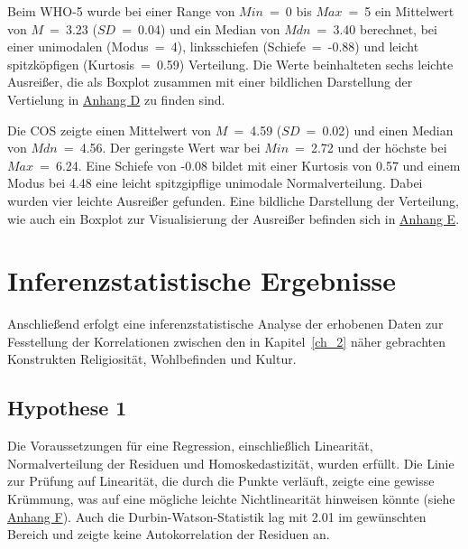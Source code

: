 Beim WHO-5 wurde bei einer Range von $Min$~=~0 bis $Max$~=~5 ein Mittelwert von $M$~=~3.23 ($SD$~=~0.04) und ein Median von $Mdn$~=~3.40 berechnet, bei einer unimodalen (Modus~=~4), linksschiefen (Schiefe~=~-0.88) und leicht spitzköpfigen (Kurtosis~=~0.59) Verteilung. Die Werte beinhalteten sechs leichte Ausreißer, die als Boxplot zusammen mit einer bildlichen Darstellung der Vertielung in \hyperref [Deskriptive_WHO]{Anhang D} zu finden sind.

Die COS zeigte einen Mittelwert von $M$~=~4.59 ($SD$~=~0.02) und einen Median von $Mdn$~=~4.56. Der geringste Wert war bei $Min$~=~2.72 und der höchste bei $Max$~=~6.24. Eine Schiefe von -0.08 bildet mit einer Kurtosis von 0.57 und einem Modus bei 4.48 eine leicht spitzgipflige unimodale Normalverteilung. Dabei wurden vier leichte Ausreißer gefunden.
Eine bildliche Darstellung der Verteilung, wie auch ein Boxplot zur Visualisierung der Ausreißer befinden sich in \hyperref [Verbreitung_COS]{Anhang E}.

%

%



\section{Inferenzstatistische Ergebnisse}    \label{sec_4.2}
Anschließend erfolgt eine inferenzstatistische Analyse der erhobenen Daten zur Fesstellung der Korrelationen zwischen den in Kapitel~\ref{ch_2} näher gebrachten Konstrukten Religiosität, Wohlbefinden und Kultur. 

\subsection{Hypothese 1}    \label{subsec_4.2.1}
Die Voraussetzungen für eine Regression, einschließlich Linearität, Normalverteilung der Residuen und Homoskedastizität, wurden erfüllt. Die Linie zur Prüfung auf Linearität, die durch die Punkte verläuft, zeigte eine gewisse Krümmung, was auf eine mögliche leichte Nichtlinearität hinweisen könnte (siehe \hyperref [H1_Voraussetzungen]{Anhang F}). Auch die Durbin-Watson-Statistik lag mit 2.01 im gewünschten Bereich und zeigte keine Autokorrelation der Residuen an. 

